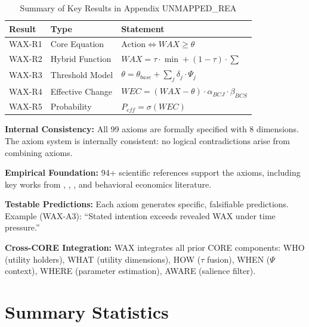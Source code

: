 \begin{table}[htbp]
\centering
\caption{Summary of Key Results in Appendix UNMAPPED_REA}
\label{tab:av-results}
\renewcommand{\arraystretch}{1.2}
\begin{tabular}{@{}llp{6cm}@{}}
\toprule
\textbf{Result} & \textbf{Type} & \textbf{Statement} \\
\midrule
WAX-R1 & Core Equation & $\text{Action} \Leftrightarrow WAX \geq \theta$ \\
WAX-R2 & Hybrid Function & $WAX = \tau \cdot \min + (1-\tau) \cdot \sum$ \\
WAX-R3 & Threshold Model & $\theta = \theta_{base} + \sum_j \delta_j \cdot \Psi_j$ \\
WAX-R4 & Effective Change & $WEC = (WAX - \theta) \cdot \alpha_{BCJ} \cdot \beta_{BCS}$ \\
WAX-R5 & Probability & $P_{eff} = \sigma(WEC)$ \\
\bottomrule
\end{tabular}
\end{table}

\begin{tcolorbox}[colback=green!5!white, colframe=green!75!black,
    title=\textbf{Validation Summary}]

\textbf{Internal Consistency:}
All 99 axioms are formally specified with 8 dimensions. The axiom system is
internally consistent: no logical contradictions arise from combining axioms.

\textbf{Empirical Foundation:}
94+ scientific references support the axioms, including key works from
\citet{kahneman2011}, \citet{tversky1992}, \citet{sheeran2016}, and behavioral
economics literature.

\textbf{Testable Predictions:}
Each axiom generates specific, falsifiable predictions. Example (WAX-A3):
``Stated intention exceeds revealed WAX under time pressure.''

\textbf{Cross-CORE Integration:}
WAX integrates all prior CORE components: WHO (utility holders), WHAT (utility dimensions),
HOW ($\tau$ fusion), WHEN ($\Psi$ context), WHERE (parameter estimation), AWARE (salience filter).

\end{tcolorbox}


\section{Summary Statistics}
\label{sec:av-summary}

